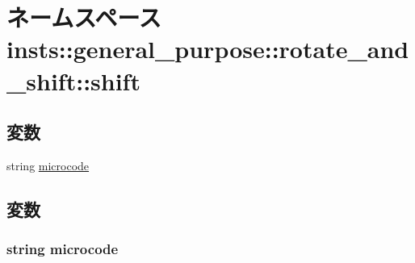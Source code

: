 \hypertarget{namespaceinsts_1_1general__purpose_1_1rotate__and__shift_1_1shift}{
\section{ネームスペース insts::general\_\-purpose::rotate\_\-and\_\-shift::shift}
\label{namespaceinsts_1_1general__purpose_1_1rotate__and__shift_1_1shift}
}
\subsection*{変数}
\begin{DoxyCompactItemize}
\item 
string \hyperlink{namespaceinsts_1_1general__purpose_1_1rotate__and__shift_1_1shift_a770f11a173e99389a8802f0107ed8f52}{microcode}
\end{DoxyCompactItemize}


\subsection{変数}
\hypertarget{namespaceinsts_1_1general__purpose_1_1rotate__and__shift_1_1shift_a770f11a173e99389a8802f0107ed8f52}{
\subsubsection[{microcode}]{\setlength{\rightskip}{0pt plus 5cm}string {\bf microcode}}}
\label{namespaceinsts_1_1general__purpose_1_1rotate__and__shift_1_1shift_a770f11a173e99389a8802f0107ed8f52}
